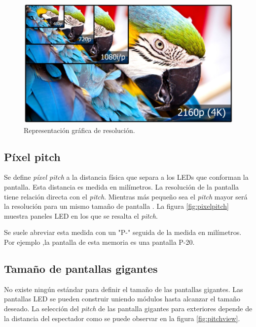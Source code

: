 \begin{figure}[htpb]
	\centering
	\includegraphics[scale=0.3]{Figures/resolucion.jpg} 
	\caption{Representación gráfica de resolución\protect\footnotemark.}
	\label{fig:grafresolucion}
\end{figure}

\subsection{Píxel pitch}
Se define \textit{píxel pitch} a la distancia física que separa a los LEDs que conforman la pantalla. Esta distancia es medida en milímetros. La resolución de la pantalla tiene relación directa con el \textit{pitch}. Mientras más pequeño sea el \textit{pitch} mayor será la resolución para un mismo tamaño de pantalla \citep{IMAGENDEF2}. La figura \ref{fig:pixelpitch} muestra paneles LED en los que se resalta el \textit{pitch}.

Se suele abreviar esta medida con un "P-" seguida de la medida en milímetros. Por ejemplo ,la pantalla de esta memoria es una pantalla P-20.



\subsection{Tamaño de pantallas gigantes}
No existe ningún estándar para definir el tamaño de las pantallas gigantes. Las pantallas LED  se pueden construir uniendo módulos hasta alcanzar el tamaño deseado. La selección del \textit{pitch} de las pantalla gigantes para exteriores depende de la distancia del espectador como se puede observar en la figura \ref{fig:pitchview}.

